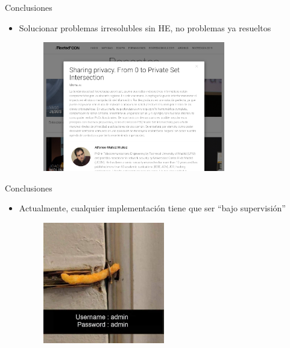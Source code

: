\documentclass{beamer}
\begin{document}
\begin{frame}{Conclusiones}
    \begin{itemize}
        \item Solucionar problemas irresolubles sin HE, no problemas ya resueltos
        \begin{figure}[H]
            \centering\includegraphics[width=0.75\textwidth]{psi-alfonso}
        \end{figure}
    \end{itemize}
\end{frame}

\begin{frame}{Conclusiones}
    \begin{itemize}
        \item Actualmente, cualquier implementación tiene que ser ``bajo supervisión''
        \begin{figure}[H]
            \centering\includegraphics[width=0.5\textwidth]{low-sec}
        \end{figure}
    \end{itemize}
\end{frame}
\end{document}
